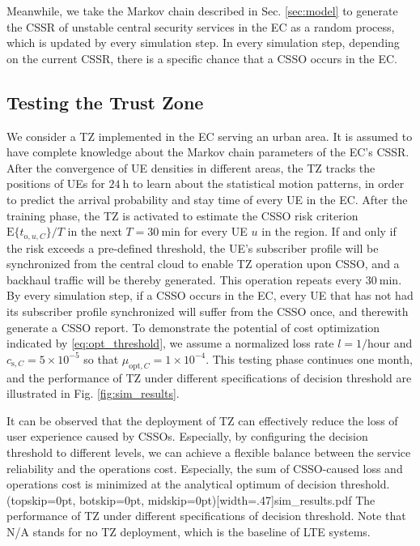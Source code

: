 \documentclass{ieeeaccess}
\newcommand{\change}[1]{#1}
\begin{document}
	Meanwhile, we take the Markov chain described in Sec. \ref{sec:model} to generate the CSSR of unstable central security services in the EC as a random process, which is updated by every simulation step. In every simulation step, depending on the current CSSR, there is a specific chance that a CSSO occurs in the EC.
	
	\subsection{Testing the Trust Zone}
	We consider a TZ implemented in the EC serving an urban area. It is assumed to have complete knowledge about the Markov chain parameters of the EC's CSSR. After the convergence of UE densities in different areas, the TZ tracks the positions of UEs for $24~\text{h}$ to learn about the statistical motion patterns, in order to predict the arrival probability and stay time of every UE in the EC. After the training phase, the TZ is activated to estimate the \change{CSSO risk criterion $\text{E}\{t_{\text{o},u,C}\}/T$ in the next $T=30~\text{min}$ for every UE $u$ in the region}. If and only if the risk exceeds a pre-defined threshold, the UE's subscriber profile will be synchronized from the central cloud to enable TZ operation upon CSSO, and a backhaul traffic will be thereby generated. This operation repeats every $30~\text{min}$. By every simulation step, if a CSSO occurs in the EC, every UE that has not had its subscriber profile synchronized will suffer from the CSSO once, and therewith generate a CSSO report. \change{To demonstrate the potential of cost optimization indicated by \eqref{eq:opt_threshold}, we assume a normalized loss rate $l=1/\text{hour}$ and $c_{\text{s},C}=5\times10^{-5}$ so that $\mu_{\text{opt},C}=1\times10^{-4}$.} This testing phase continues one month, and the performance of TZ under different specifications of \change{decision threshold} are illustrated in Fig. \ref{fig:sim_results}.
	
	It can be observed that the deployment of TZ can effectively reduce the loss of user experience caused by CSSOs. Especially, by configuring the decision threshold to different levels, we can achieve a flexible balance between the service reliability and the operations cost. \change{Especially, the sum of CSSO-caused loss and operations cost is minimized at the analytical optimum of decision threshold.}
	\Figure[htbp!](topskip=0pt, botskip=0pt, midskip=0pt)[width=.47\textwidth]{sim_results.pdf}
	{The performance of TZ under different specifications of \change{decision threshold. Note that N/A stands for no TZ deployment, which is the baseline of LTE systems.}\label{fig:sim_results}}
	
\end{document}
